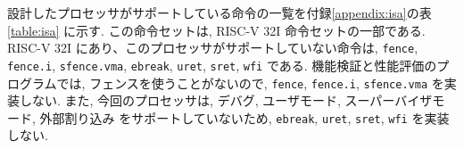 \documentclass[../specifications.tex]{subfiles}
\begin{document}
  設計したプロセッサがサポートしている命令の一覧を付録\ref{appendix:isa}の表\ref{table:isa} に示す.
  この命令セットは, RISC-V 32I 命令セットの一部である.
  RISC-V 32I にあり、このプロセッサがサポートしていない命令は, 
  \verb|fence|, \verb|fence.i|, \verb|sfence.vma|, \verb|ebreak|, 
  \verb|uret|, \verb|sret|, \verb|wfi| である.
  機能検証と性能評価のプログラムでは, フェンスを使うことがないので, 
  \verb|fence|, \verb|fence.i|, \verb|sfence.vma| を実装しない.
  また, 今回のプロセッサは, デバグ, ユーザモード, スーパーバイザモード, 外部割り込み
  をサポートしていないため, \verb|ebreak|, \verb|uret|, 
  \verb|sret|, \verb|wfi| を実装しない.
  
\end{document}
